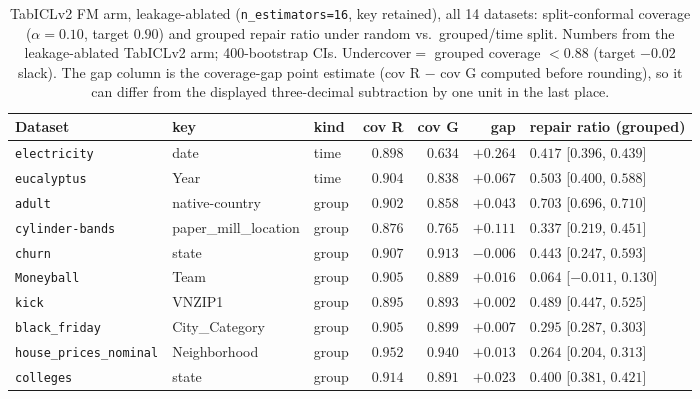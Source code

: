 \documentclass[11pt]{article}
\begin{document}
\begin{table}[h]
\centering\small
\caption{TabICLv2 FM arm, leakage-ablated (\texttt{n\_estimators=16}, key retained), all 14 datasets:
split-conformal coverage ($\alpha=0.10$, target $0.90$) and grouped repair ratio under random vs.\
grouped/time split. Numbers from the leakage-ablated TabICLv2 arm; 400-bootstrap CIs.
Undercover$=$ grouped coverage $<0.88$ (target $-0.02$ slack). The gap column is the coverage-gap point
estimate (cov R $-$ cov G computed before rounding), so it can differ from the displayed three-decimal
subtraction by one unit in the last place.}\label{tab:fm}
\begin{tabular}{lllrrrl}
\toprule
Dataset & key & kind & cov R & cov G & gap & repair ratio (grouped) \\
\midrule
\texttt{electricity}           & date                & time  & $0.898$ & $0.634$ & $+0.264$ & $0.417$ [$0.396$, $0.439$] \\
\texttt{eucalyptus}            & Year                & time  & $0.904$ & $0.838$ & $+0.067$ & $0.503$ [$0.400$, $0.588$] \\
\texttt{adult}                 & native-country      & group & $0.902$ & $0.858$ & $+0.043$ & $0.703$ [$0.696$, $0.710$] \\
\texttt{cylinder-bands}        & paper\_mill\_location & group & $0.876$ & $0.765$ & $+0.111$ & $0.337$ [$0.219$, $0.451$] \\
\texttt{churn}                 & state               & group & $0.907$ & $0.913$ & $-0.006$ & $0.443$ [$0.247$, $0.593$] \\
\texttt{Moneyball}             & Team                & group & $0.905$ & $0.889$ & $+0.016$ & $0.064$ [$-0.011$, $0.130$] \\
\texttt{kick}                  & VNZIP1              & group & $0.895$ & $0.893$ & $+0.002$ & $0.489$ [$0.447$, $0.525$] \\
\texttt{black\_friday}         & City\_Category      & group & $0.905$ & $0.899$ & $+0.007$ & $0.295$ [$0.287$, $0.303$] \\
\texttt{house\_prices\_nominal}& Neighborhood        & group & $0.952$ & $0.940$ & $+0.013$ & $0.264$ [$0.204$, $0.313$] \\
\texttt{colleges}              & state               & group & $0.914$ & $0.891$ & $+0.023$ & $0.400$ [$0.381$, $0.421$] \\

\end{tabular}
\end{table}
\end{document}
